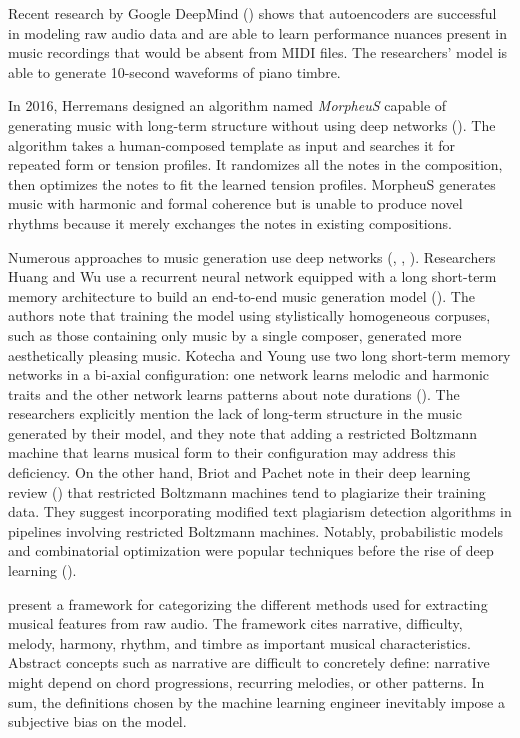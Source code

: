 \documentclass{article}
\begin{document}
Recent research by Google DeepMind (\cite{the_challenge_of_realistic}) shows that autoencoders are successful in modeling raw audio data and are able to learn performance nuances present in music recordings that would be absent from MIDI files. The researchers' model is able to generate 10-second waveforms of piano timbre.

In 2016, Herremans designed an algorithm named \textit{MorpheuS} capable of generating music with long-term structure without using deep networks (\cite{morpheus_automatic_music_generation}). The algorithm takes a human-composed template as input and searches it for repeated form or tension profiles. It randomizes all the notes in the composition, then optimizes the notes to fit the learned tension profiles. MorpheuS generates music with harmonic and formal coherence but is unable to produce novel rhythms because it merely exchanges the notes in existing compositions.

Numerous approaches to music generation use deep networks (\cite{deepbach_a_steerable_model}, \cite{improved_music_feature_learning}, \cite{learning_features_from_music}). Researchers Huang and Wu use a recurrent neural network equipped with a long short-term memory architecture to build an end-to-end music generation model (\cite{deep_learning_for_music}). The authors note that training the model using stylistically homogeneous corpuses, such as those containing only music by a single composer, generated more aesthetically pleasing music. Kotecha and Young use two long short-term memory networks in a bi-axial configuration: one network learns melodic and harmonic traits and the other network learns patterns about note durations (\cite{generating_music_using_an}). The researchers explicitly mention the lack of long-term structure in the music generated by their model, and they note that adding a restricted Boltzmann machine that learns musical form to their configuration may address this deficiency. On the other hand, Briot and Pachet note in their deep learning review (\cite{music_generation_by_deep}) that restricted Boltzmann machines tend to plagiarize their training data. They suggest incorporating modified text plagiarism detection algorithms in pipelines involving restricted Boltzmann machines. Notably, probabilistic models and combinatorial optimization were popular techniques before the rise of deep learning (\cite{a_functional_taxonomy_of}).

\cite{a_functional_taxonomy_of} present a framework for categorizing the different methods used for extracting musical features from raw audio. The framework cites narrative, difficulty, melody, harmony, rhythm, and timbre as important musical characteristics. Abstract concepts such as narrative are difficult to concretely define: narrative might depend on chord progressions, recurring melodies, or other patterns. In sum, the definitions chosen by the machine learning engineer inevitably impose a subjective bias on the model.
\end{document}
